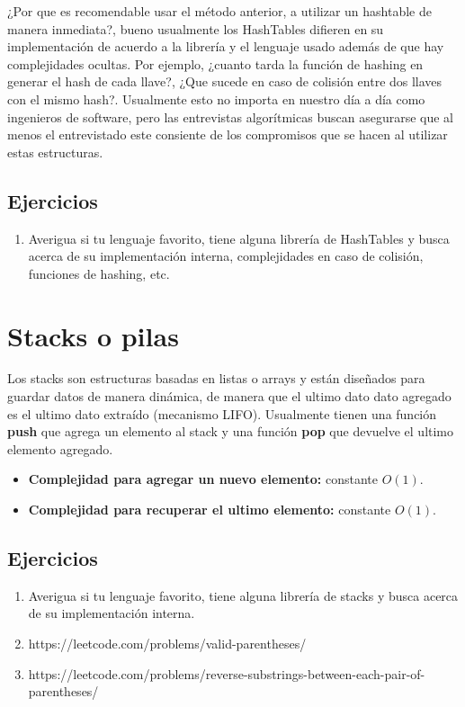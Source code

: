 ¿Por que es recomendable usar el método anterior, a utilizar un hashtable de manera inmediata?, bueno usualmente los HashTables difieren en su implementación de acuerdo a la librería y el lenguaje usado además de que hay complejidades ocultas. Por ejemplo, ¿cuanto tarda la función de hashing en generar el hash de cada llave?, ¿Que sucede en caso de colisión entre dos llaves con el mismo hash?. Usualmente esto no importa en nuestro día a día como ingenieros de software, pero las entrevistas algorítmicas buscan asegurarse que al menos el entrevistado este consiente de los compromisos que se hacen al utilizar estas estructuras.

\subsection{Ejercicios}
\begin{enumerate}
    \item Averigua si tu lenguaje favorito, tiene alguna librería de HashTables y busca acerca de su implementación interna, complejidades en caso de colisión, funciones de hashing, etc.
\end{enumerate}

\section{Stacks o pilas}

Los stacks son estructuras basadas en listas o arrays y están diseñados para guardar datos de manera dinámica, de manera que el ultimo dato dato agregado es el ultimo dato extraído (mecanismo LIFO). Usualmente tienen una función \textbf{push} que agrega un elemento al stack y una función \textbf{pop} que devuelve el ultimo elemento agregado.

\begin{itemize}
    \item \textbf{Complejidad para agregar un nuevo elemento:} constante $O(1)$.
    \item \textbf{Complejidad para recuperar el ultimo elemento:} constante $O(1)$.
\end{itemize}

\subsection{Ejercicios}

\begin{enumerate}
    \item Averigua si tu lenguaje favorito, tiene alguna librería de stacks y busca acerca de su implementación interna.
    \item https://leetcode.com/problems/valid-parentheses/
    \item https://leetcode.com/problems/reverse-substrings-between-each-pair-of-parentheses/
\end{enumerate}


